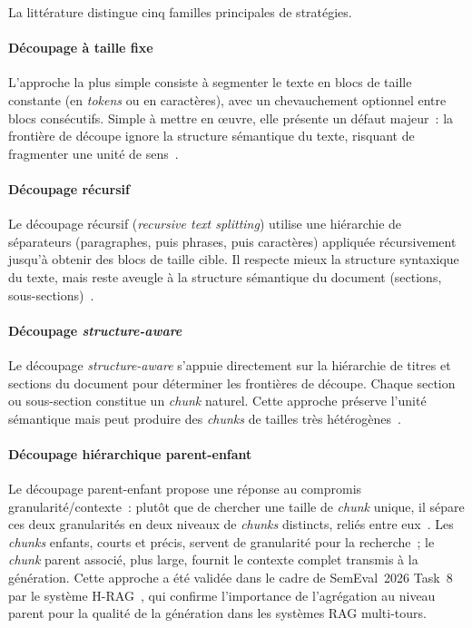 \documentclass[11pt,a4paper]{article}
\begin{document}
La littérature distingue cinq familles principales de stratégies.

\paragraph{Découpage à taille fixe}

L'approche la plus simple consiste à segmenter le texte en blocs de taille constante (en \textit{tokens} ou en caractères), avec un chevauchement optionnel entre blocs consécutifs. Simple à mettre en \oe{}uvre, elle présente un défaut majeur~: la frontière de découpe ignore la structure sémantique du texte, risquant de fragmenter une unité de sens~\cite{smith2024chunking}.

\paragraph{Découpage récursif}

Le découpage récursif (\textit{recursive text splitting}) utilise une hiérarchie de séparateurs (paragraphes, puis phrases, puis caractères) appliquée récursivement jusqu'à obtenir des blocs de taille cible. Il respecte mieux la structure syntaxique du texte, mais reste aveugle à la structure sémantique du document (sections, sous-sections)~\cite{langchain2023}.

\paragraph{Découpage \textit{structure-aware}}

Le découpage \textit{structure-aware} s'appuie directement sur la hiérarchie de titres et sections du document pour déterminer les frontières de découpe. Chaque section ou sous-section constitue un \textit{chunk} naturel. Cette approche préserve l'unité sémantique mais peut produire des \textit{chunks} de tailles très hétérogènes~\cite{yepes2024chunking}.

\paragraph{Découpage hiérarchique parent-enfant}

Le découpage parent-enfant propose une réponse au compromis granularité/contexte~: plutôt que de chercher une taille de \textit{chunk} unique, il sépare ces deux granularités en deux niveaux de \textit{chunks} distincts, reliés entre eux~\cite{langchain2023}. Les \textit{chunks} enfants, courts et précis, servent de granularité pour la recherche~; le \textit{chunk} parent associé, plus large, fournit le contexte complet transmis à la génération. Cette approche a été validée dans le cadre de SemEval~2026 Task~8 par le système H-RAG~\cite{hrag2026semeval}, qui confirme l'importance de l'agrégation au niveau parent pour la qualité de la génération dans les systèmes RAG multi-tours.
\end{document}
